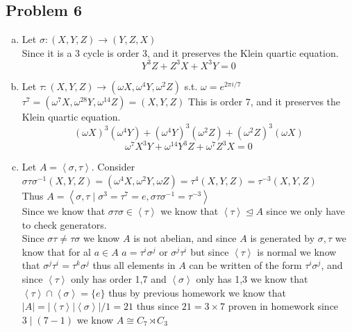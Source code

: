 \documentclass[12pt, letterpaper]{article}
\theoremstyle{definition}
\newcommand{\ang}[1]{\left\langle #1 \right\rangle}
\begin{document}
\subsection*{Problem 6}
\begin{enumerate}[(a)]
  \item Let $\sigma: (X,Y,Z) \rightarrow (Y, Z, X)$\\
  Since it is a 3 cycle is order 3, and it preserves the Klein quartic equation.
  \[Y^3Z+Z^3X+X^3Y=0\]
  \item Let $\tau: (X,Y,Z) \rightarrow (\omega X, \omega^4 Y, \omega^2 Z)$ s.t. $\omega=e^{2\pi i/7}$\\
  $\tau^7=(\omega^7X,\omega^{28}Y,\omega^{14}Z)=(X,Y,Z)$ This is order 7, and it preserves the Klein quartic equation.
  \[(\omega X)^3(\omega^4 Y)+(\omega^4 Y)^3(\omega^2 Z)+(\omega^2 Z)^3(\omega X)\]
  \[\omega^7X^3Y+\omega^{14}Y^3Z+\omega^7 Z^3X=0\]
  \item Let $A=\ang{\sigma, \tau}$. Consider $\sigma\tau\sigma^{-1}(X,Y,Z)=(\omega^4X,\omega^2Y,\omega Z)=\tau^{4}(X,Y,Z)=\tau^{-3}(X,Y,Z)$\\
  Thus $A=\ang{\sigma,\tau \mid \sigma^3=\tau^7=e, \sigma\tau\sigma^{-1}=\tau^{-3}}$\\
  Since we know that $\sigma\tau\sigma \in \ang{\tau}$ we know that $\ang{\tau} \unlhd A$ since we only have to check generators.\\
  Since $\sigma\tau \neq \tau\sigma$ we know $A$ is not abelian, and since $A$ is generated by $\sigma,\tau$ we know that for al $a \in A$ $a=\tau^i \sigma^j$ or $\sigma^j\tau^i$ but since $\ang{\tau}$ is normal we know that $\sigma^{j}\tau^i=\tau^k\sigma^{j}$ thus all elements in $A$ can be written of the form
  $\tau^i\sigma^j$, and since $\ang{\tau}$ only has order 1,7
  and $\ang{\sigma}$ only has 1,3 we know that $\ang{\tau} \cap \ang{\sigma}= \{e\}$ thus by previous homework we know that $|A|=|\ang{\tau}|\ang{\sigma}|/1=21$ thus since $21=3 \times 7$ proven in homework since $3 \mid (7-1)$ we know
  $A \cong C_7 \rtimes C_3$ 
\end{enumerate}
\end{document}
